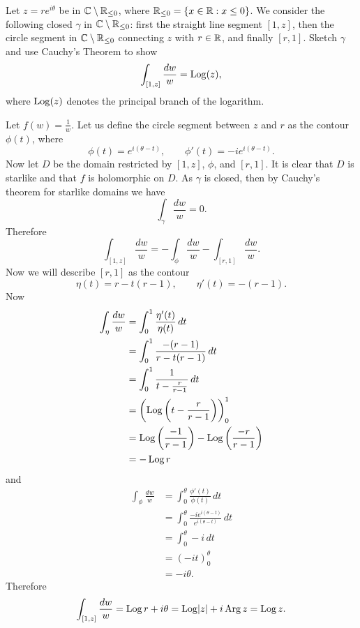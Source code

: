\setcounter{question}{1}
\question Let $z = re^{i\theta}$ be in $\mathbb{C} \setminus \mathbb{R}_{\leq 0}$,
where $\mathbb{R}_{\leq 0} = \{x \in \mathbb{R}: x \leq 0\}$.
We consider the following closed $\gamma$ in $\mathbb{C} \setminus \mathbb{R}_{\leq 0}$:
first the straight line segment $[1, z]$,
then the circle segment in $\mathbb{C} \setminus \mathbb{R}_{\leq 0}$ connecting $z$ with $r \in \mathbb{R}$,
and finally $[r, 1]$.
Sketch $\gamma$ and use Cauchy's Theorem to show
\[
    \int_{[1,z]} \frac{dw}{w} = \operatorname{Log}(z),
\]
where $\operatorname{Log}(z)$ denotes the principal branch of the logarithm.
\begin{solution}
    Let $f(w) = \frac1w$.
    Let us define the circle segment between $z$ and $r$ as the contour$\phi(t)$,
    where
    \[
        \phi(t) = e^{i(\theta - t)}, \qquad \phi'(t) = -ie^{i(\theta - t)}.
    \]
    Now let $D$ be the domain restricted by $[1, z]$, $\phi$, and $[r, 1]$.
    It is clear that $D$ is starlike and that $f$ is holomorphic on $D$.
    As $\gamma$ is closed, then by Cauchy's theorem for starlike domains
    we have
    \[
        \int_\gamma \frac{dw}{w} = 0.
    \]
    Therefore
    \[
        \int_{[1,z]} \frac{dw}{w} 
        = -\int_\phi \frac{dw}{w} - \int_{[r, 1]} \frac{dw}{w}.
    \]
    Now we will describe $[r, 1]$ as the contour
    \[ \eta(t) = r - t(r - 1), \qquad \eta'(t) = -(r - 1). \]
    Now
    \begin{align*}
        \int_\eta \frac{dw}{w}
        &= \int_0^1 \frac{\eta'(t)}{\eta(t)} \, dt \\
        &= \int_0^1 \frac{-(r-1)}{r-t(r-1)} \,dt \\
        &= \int_0^1 \frac{1}{t-\frac{r}{r-1}} \,dt \\
        &= \left(\operatorname{Log}\left(t-\frac r{r-1}\right)\right)^1_0 \\
        &= \operatorname{Log}\left(\frac{-1}{r-1}\right) - \operatorname{Log}\left(\frac{-r}{r-1}\right) \\
        &= -\operatorname{Log}{r}
    \end{align*}
    and
    \begin{align*}
        \int_\phi \frac{dw}{w}
        &= \int_0^\theta \frac{\phi'(t)}{\phi(t)} \,dt \\
        &= \int_0^\theta \frac{-ie^{i(\theta - t)}}{e^{i(\theta - t)}} \,dt \\
        &= \int_0^\theta -i \,dt \\
        &= \left(-it\right)_0^\theta \\
        &= -i\theta.
    \end{align*}
    Therefore
    \[
        \int_{[1,z]} \frac{dw}{w}
        = \operatorname{Log}{r} + i\theta
        = \operatorname{Log}\lvert z \rvert + i \operatorname{Arg} z
        = \operatorname{Log} z.
    \]
\end{solution}

